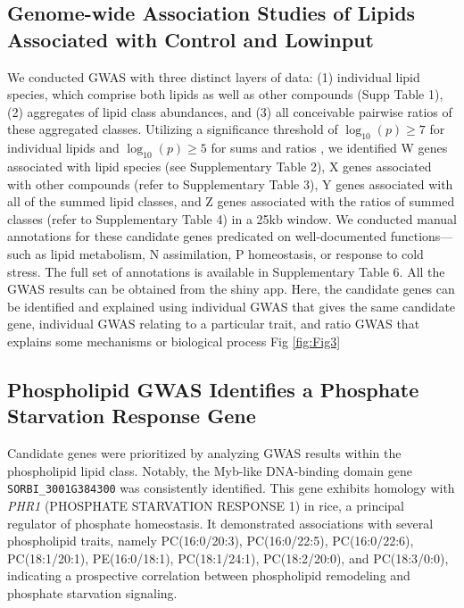 \documentclass[10pt,letterpaper]{article}
\begin{document}
\subsection*{Genome-wide Association Studies of Lipids Associated with Control and Lowinput}
We conducted GWAS with three distinct layers of data: (1) individual lipid species, which comprise both lipids  as well as other compounds (Supp Table 1), (2) aggregates of lipid class abundances, and (3) all conceivable pairwise ratios of these aggregated classes. Utilizing a significance threshold of $\log_{10}(p)\ge7$ for individual lipids and $\log_{10}(p)\ge5$ for sums and ratios , we identified W genes associated with lipid species (see Supplementary Table 2), X genes associated with other compounds (refer to Supplementary Table 3), Y genes associated with all of the summed lipid classes, and Z genes associated with the ratios of summed classes (refer to Supplementary Table 4) in a 25kb window. We conducted manual annotations for these candidate genes predicated on well-documented functions—such as lipid metabolism, N assimilation, P homeostasis, or response to cold stress. The full set of annotations is available in Supplementary Table 6. All the GWAS results can be obtained from the shiny app. Here, the candidate genes can be identified and explained using individual GWAS that gives the same candidate gene, individual GWAS relating to a particular trait, and ratio GWAS that explains some mechanisms or biological process Fig \ref{fig:Fig3}



\subsection*{Phospholipid GWAS Identifies a Phosphate Starvation Response Gene}
Candidate genes were prioritized by analyzing GWAS results within the phospholipid lipid class. Notably, the Myb-like DNA-binding domain gene \texttt{SORBI\_3001G384300} was consistently identified. This gene exhibits homology with \textit{PHR1} (PHOSPHATE STARVATION RESPONSE 1) in rice, a principal regulator of phosphate homeostasis. It demonstrated associations with several phospholipid traits, namely PC(16:0/20:3), PC(16:0/22:5), PC(16:0/22:6), PC(18:1/20:1), PE(16:0/18:1), PC(18:1/24:1), PC(18:2/20:0), and PC(18:3/0:0), indicating a prospective correlation between phospholipid remodeling and phosphate starvation signaling.
\end{document}
